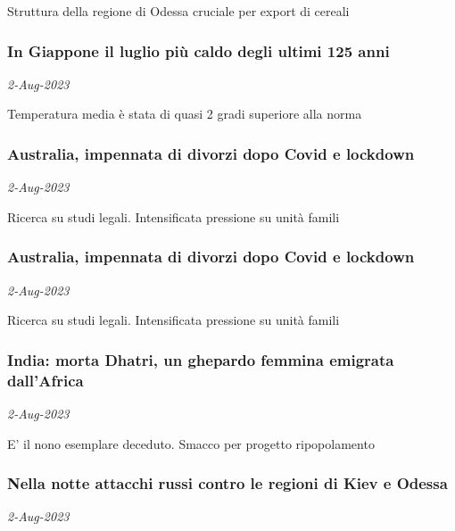 Struttura della regione di Odessa cruciale per export di cereali
\subsubsection{In Giappone il luglio pi\`{u} caldo degli ultimi 125 anni \href{https://www.ansa.it/sito/notizie/mondo/asia/2023/08/02/in-giappone-il-luglio-piu-caldo-degli-ultimi-125-anni_18a100b5-7de1-4f75-9981-20f0480c70d3.html}{}}
\textit{2-Aug-2023}

Temperatura media \`{e} stata di quasi 2 gradi superiore alla norma
\subsubsection{Australia, impennata di divorzi dopo Covid e lockdown \href{https://www.ansa.it/sito/notizie/mondo/asia/2023/08/02/australia-impennata-di-divorzi-dopo-covid-e-lockdown_66f74208-e20c-4316-9968-6d07aaddcda0.html}{}}
\textit{2-Aug-2023}

Ricerca su studi legali. Intensificata pressione su unit\`{a} famili
\subsubsection{Australia, impennata di divorzi dopo Covid e lockdown \href{https://www.ansa.it/sito/notizie/mondo/2023/08/02/australia-impennata-di-divorzi-dopo-covid-e-lockdown_63f70e2d-f8ad-4744-932a-9a137c56ebda.html}{}}
\textit{2-Aug-2023}

Ricerca su studi legali. Intensificata pressione su unit\`{a} famili
\subsubsection{India: morta Dhatri, un ghepardo femmina emigrata dall'Africa \href{https://www.ansa.it/sito/notizie/mondo/asia/2023/08/02/india-morta-dhatri-un-ghepardo-femmina-emigrata-dallafrica_c27778cb-eab0-4695-8ef2-8fcc1eff3551.html}{}}
\textit{2-Aug-2023}

E' il nono esemplare deceduto. Smacco per progetto ripopolamento
\subsubsection{Nella notte attacchi russi contro le regioni di Kiev e Odessa \href{https://www.ansa.it/sito/notizie/mondo/europa/2023/08/02/nella-notte-attacchi-russi-contro-le-regioni-di-kiev-e-odessa_06ba9308-36f1-496a-bb91-1296faf48b58.html}{}}
\textit{2-Aug-2023}

